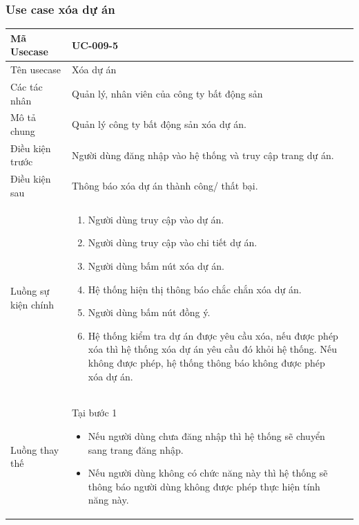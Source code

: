 \documentclass[12pt,a4paper]{article}
\begin{document}
    \subsubsection*{Use case xóa dự án }
    \begin{table}[H]
        \centering
        \begin{tabular}{|p{3.5cm}|p{11.5cm}|c|}
            \hline
            Mã Usecase      & UC-009-5                                                   \\
            \hline
            Tên usecase     & Xóa dự án                                                  \\
            \hline
            Các tác nhân    & Quản lý, nhân viên của công ty bất động sản                \\
            \hline
            Mô tả chung     & Quản lý công ty bất động sản xóa dự án.                    \\
            \hline

            Điều kiện trước & Người dùng đăng nhập vào hệ thống và truy cập trang dự án. \\
            \hline

            Điều kiện sau   & Thông báo xóa dự án thành công/ thất bại.                  \\
            \hline

            Luồng sự kiện chính & \vspace{-.8cm}\begin{enumerate}
                                                    \item Người dùng truy cập vào dự án.
                                                    \item Người dùng truy cập vào chi tiết dự án.
                                                    \item  Người dùng bấm nút xóa dự án.
                                                    \item  Hệ thống hiện thị thông báo chắc chắn xóa dự án.
                                                    \item  Người dùng bấm nút đồng ý.
                                                    \item Hệ thống kiểm tra dự án được yêu cầu xóa, nếu được phép xóa thì hệ thống xóa dự án yêu cầu đó khỏi hệ thống. Nếu không được phép, hệ thống thông báo không được phép xóa dự án.
            \end{enumerate}
            \\
            \hline
            Luồng thay thế & Tại bước 1\newline
            \vspace{-.8cm}\begin{itemize}
                              \item Nếu người dùng chưa đăng nhập thì hệ thống sẽ chuyển sang trang đăng nhập.
                              \item Nếu người dùng không có chức năng này thì hệ thống sẽ thông báo người dùng không được phép thực hiện tính năng này.
            \end{itemize}


\end{tabular}
\end{table}
\end{document}
